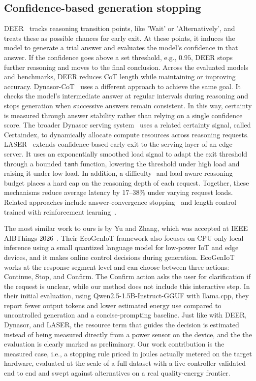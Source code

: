 \documentclass[review,12pt]{elsarticle}
\begin{document}
\subsection{Confidence-based generation stopping}
\label{sec:related-stopping}
DEER~\cite{yang2025deer} tracks reasoning transition points, like 'Wait' or 'Alternatively', and treats these as possible chances for early exit. At these points, it induces the model to generate a trial answer and evaluates the model's confidence in that answer. If the confidence goes above a set threshold, e.g., $0.95$, DEER stops further reasoning and moves to the final conclusion. Across the evaluated models and benchmarks, DEER reduces CoT length while maintaining or improving accuracy. Dynasor-CoT~\cite{fu2025dynasor} uses a different approach to achieve the same goal. It checks the model's intermediate answer at regular intervals during reasoning and stops generation when successive answers remain consistent. In this way, certainty is measured through answer stability rather than relying on a single confidence score. The broader Dynasor serving system~\cite{fu2024certaindex} uses a related certainty signal, called Certaindex, to dynamically allocate compute resources across reasoning requests. LASER~\cite{tang2026laser} extends confidence-based early exit to the serving layer of an edge server. It uses an exponentially smoothed load signal to adapt the exit threshold through a bounded \texttt{tanh} function, lowering the threshold under high load and raising it under low load. In addition, a difficulty- and load-aware reasoning budget places a hard cap on the reasoning depth of each request. Together, these mechanisms reduce average latency by 17--38\% under varying request loads.
Related approaches include answer-convergence
stopping~\cite{liu2025answerconv} and length control trained with
reinforcement learning~\cite{aggarwal2025l1}.

The most similar work to ours is by Yu and Zhang, which was accepted at IEEE AIBThings 2026~\cite{yu2026ecogeniot}. Their EcoGenIoT framework also focuses on CPU-only local inference using a small quantized language model for low-power IoT and edge devices, and it makes online control decisions during generation. EcoGenIoT works at the response segment level and can choose between three actions: Continue, Stop, and Confirm. The Confirm action asks the user for clarification if the request is unclear, while our method does not include this interactive step. In their initial evaluation, using Qwen2.5-1.5B-Instruct-GGUF with llama.cpp, they report fewer output tokens and lower estimated energy use compared to uncontrolled generation and a concise-prompting baseline. Just like with DEER,
Dynasor, and LASER, the resource term that guides the decision is estimated
instead of being measured directly from a power sensor on the device, and the
the evaluation is clearly marked as preliminary. Our work
contribution is the measured case, i.e., a stopping rule priced in joules
actually metered on the target hardware, evaluated at the scale of a
full dataset with a live controller validated end to end and swept
against alternatives on a real quality-energy frontier.
\end{document}
